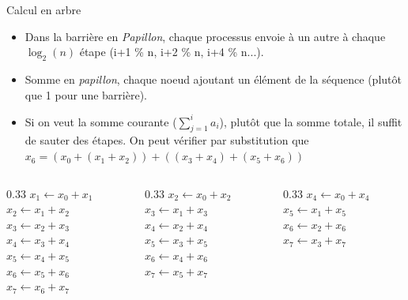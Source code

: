 \documentclass[10pt]{beamer}
\begin{document}
\begin{frame}[fragile]{Calcul en arbre}

  \begin{itemize}
    \item Dans la barrière en \textit{Papillon}, chaque processus envoie à un autre à chaque $\log_2(n)$ étape (i+1 \% n, i+2 \% n, i+4 \% n...). 

    \item Somme en \textit{papillon}, chaque noeud ajoutant un élément de la séquence (plutôt que 1 pour une barrière).

    \item Si on veut la somme courante ($\sum_{j=1}^i a_i$), plutôt que la somme totale, il suffit de sauter des étapes. On peut vérifier par substitution que $x_6 = (x_0 + (x_1+x_2)) + ((x_3+x_4) + (x_5+x_6))$
  \end{itemize}
  \begin{columns}[t]
    \begin{column}{0.33\textwidth}
$x_1 \leftarrow x_0 + x_1$ \\
$x_2 \leftarrow x_1 + x_2$ \\
$x_3 \leftarrow x_2 + x_3$ \\
$x_4 \leftarrow x_3 + x_4$ \\
$x_5 \leftarrow x_4 + x_5$ \\
$x_6 \leftarrow x_5 + x_6$ \\
$x_7 \leftarrow x_6 + x_7$ \\
    \end{column}
    \begin{column}{0.33\textwidth}
$x_2 \leftarrow x_0 + x_2$ \\
$x_3 \leftarrow x_1 + x_3$ \\
$x_4 \leftarrow x_2 + x_4$ \\
$x_5 \leftarrow x_3 + x_5$ \\
$x_6 \leftarrow x_4 + x_6$ \\
$x_7 \leftarrow x_5 + x_7$ \\
    \end{column}
    \begin{column}{0.33\textwidth}
$x_4 \leftarrow x_0 + x_4$ \\
$x_5 \leftarrow x_1 + x_5$ \\
$x_6 \leftarrow x_2 + x_6$ \\
$x_7 \leftarrow x_3 + x_7$ \\
    \end{column}
  \end{columns}
\end{frame}
\end{document}
